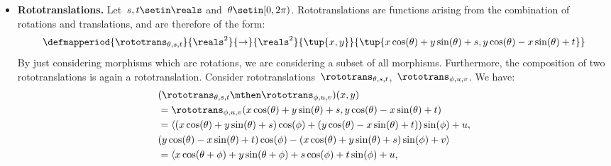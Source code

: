 {\begin{solution}
\begin{itemize}
\begin{equation}
\begin{aligned}
                      (\rotation_{\theta}\mthen \rotation_{\phi})(x,y)
                       & =\rotation(\tup{x\cos(\theta)+y\sin(\theta), y\cos(\theta)-x\sin(\theta)}) \\
                       & =\tup{x\cos(\theta+\phi)+y\sin(\theta+\phi), y\cos(\theta+\phi)-x\sin(\theta+\phi)} \\
                       & =\rotation_{\theta+\phi}.
                  \end{aligned}
              \end{equation}
              Finally, the  in \Draw corresponds to a rotation of the form $\rotation_{0}$.
        \item \textbf{Rototranslations.}
              Let~$s,t\setin \reals$ and~$\theta \setin [0,2\pi)$.
              Rototranslations are functions arising from the combination of rotations and translations, and are therefore of the form:
              \begin{equation}
                  \defmapperiod{
                      \rototrans_{\theta,s,t}
                  }{
                      \reals^2
                  }{
                      \to
                  }{
                      \reals^2
                  }{
                      \tup{x,y}
                  }{
                      \tup{x\cos(\theta)+y\sin(\theta)+s, y\cos(\theta)-x\sin(\theta)+t}
                  }
              \end{equation}
              By just considering morphisms which are rotations, we are considering a subset of all morphisms.
              Furthermore, the composition of two rototranslations is again a rototranslation.
              Consider rototranslations~$\rototrans_{\theta,s,t}$,~$\rototrans_{\phi,u,v}$.
              We have:
              \begin{equation}
                  \begin{aligned}
                       & (\rototrans_{\theta,s,t}\mthen \rototrans_{\phi,u,v})(x,y) \\
                       & =\rototrans_{\phi,u,v}(x\cos(\theta)+y\sin(\theta)+s, y\cos(\theta)-x\sin(\theta)+t) \\
                       & =\langle(x\cos(\theta)+y\sin(\theta)+s)\cos(\phi)+(y\cos(\theta)-x\sin(\theta)+t))\sin(\phi)+u, \\
                       & (y\cos(\theta)-x\sin(\theta)+t)\cos(\phi) - (x\cos(\theta)+y\sin(\theta)+s)\sin(\phi)+v\rangle \\
                       & =\langle x\cos(\theta+\phi)+y\sin(\theta+\phi)+s\cos(\phi)+t\sin(\phi)+u, \\

\end{aligned}
\end{equation}
\end{itemize}
\end{solution}}

